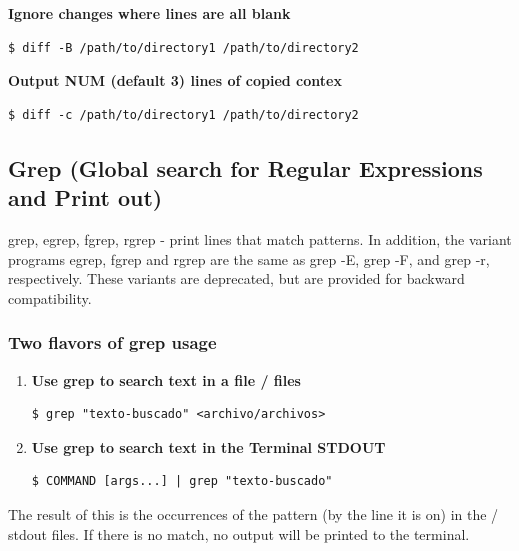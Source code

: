 \documentclass{article}
\newenvironment{blocktemplate}[1]{%
    \tcolorbox[beamer,%
    noparskip,breakable,
    colframe=Blue,%
    colbacklower=LimeGreen!75!LightGreen,%
    title=#1]}%
    {\endtcolorbox}
\newenvironment{codetemplate}[1][]{%
  \mybasecolorbox[#1]
  \itshape
}{%
  \endmybasecolorbox
}
\begin{document}
\textbf{Ignore changes where lines are all blank}
\begin{codetemplate}{}
\begin{verbatim}
$ diff -B /path/to/directory1 /path/to/directory2
\end{verbatim}
\end{codetemplate}

\textbf{Output NUM (default 3) lines of copied contex}
\begin{codetemplate}{}
\begin{verbatim}
$ diff -c /path/to/directory1 /path/to/directory2
\end{verbatim}
\end{codetemplate}

\subsection{Grep (Global search for Regular Expressions and Print out)}

\begin{blocktemplate}{Nota}
grep, egrep, fgrep, rgrep - print lines that match patterns.
In addition, the variant programs egrep, fgrep and rgrep are the same as grep -E, grep -F, and grep -r, respectively.  These variants are deprecated, but are provided for backward compatibility.
\end{blocktemplate}

\subsubsection{Two flavors of grep usage}
\begin{enumerate}
    \item \textbf{Use grep to search text in a file / files}
\begin{codetemplate}{}
\begin{verbatim}
$ grep "texto-buscado" <archivo/archivos>
\end{verbatim}
\end{codetemplate}

    \item \textbf{Use grep to search text in the Terminal STDOUT}
\begin{codetemplate}{}
\begin{verbatim}
$ COMMAND [args...] | grep "texto-buscado"
\end{verbatim}
\end{codetemplate}
\end{enumerate}
The result of this is the occurrences of the pattern (by the line it is on) in the / stdout files. If there is no match, no output will be printed to the terminal.
\end{document}
